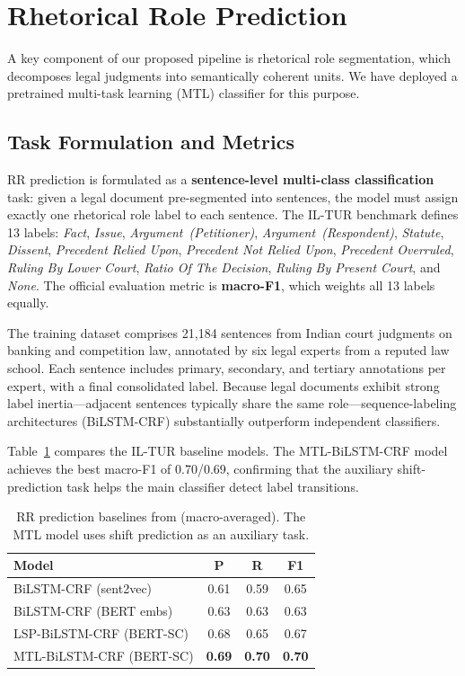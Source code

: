\documentclass[11pt]{article}
\begin{document}
\section{Rhetorical Role Prediction}

A key component of our proposed pipeline is rhetorical role segmentation, which decomposes legal judgments into semantically coherent units.
We have deployed a pretrained multi-task learning (MTL) classifier for this purpose.

\subsection{Task Formulation and Metrics}

RR prediction is formulated as a \textbf{sentence-level multi-class classification} task: given a legal document pre-segmented into sentences, the model must assign exactly one rhetorical role label to each sentence.
The IL-TUR benchmark defines 13 labels: \emph{Fact}, \emph{Issue}, \emph{Argument~(Petitioner)}, \emph{Argument~(Respondent)}, \emph{Statute}, \emph{Dissent}, \emph{Precedent Relied Upon}, \emph{Precedent Not Relied Upon}, \emph{Precedent Overruled}, \emph{Ruling By Lower Court}, \emph{Ratio Of The Decision}, \emph{Ruling By Present Court}, and \emph{None}.
The official evaluation metric is \textbf{macro-F1}, which weights all 13 labels equally.

The training dataset \cite{malik2022rr} comprises 21,184 sentences from Indian court judgments on banking and competition law, annotated by six legal experts from a reputed law school.
Each sentence includes primary, secondary, and tertiary annotations per expert, with a final consolidated label.
Because legal documents exhibit strong label inertia---adjacent sentences typically share the same role---sequence-labeling architectures (BiLSTM-CRF) substantially outperform independent classifiers.

Table~\ref{tab:rr_baselines} compares the IL-TUR baseline models.
The MTL-BiLSTM-CRF model achieves the best macro-F1 of 0.70/0.69, confirming that the auxiliary shift-prediction task helps the main classifier detect label transitions.

\begin{table}[htbp]
\centering
\small
\begin{tabular}{@{}lccc@{}}
\toprule
\textbf{Model} & \textbf{P} & \textbf{R} & \textbf{F1} \\
\midrule
BiLSTM-CRF (sent2vec)        & 0.61 & 0.59 & 0.65 \\
BiLSTM-CRF (BERT embs)       & 0.63 & 0.63 & 0.63 \\
LSP-BiLSTM-CRF (BERT-SC)     & 0.68 & 0.65 & 0.67 \\
MTL-BiLSTM-CRF (BERT-SC)     & \textbf{0.69} & \textbf{0.70} & \textbf{0.70} \\
\bottomrule
\end{tabular}
\caption{RR prediction baselines from \citet{malik2022rr} (macro-averaged). The MTL model uses shift prediction as an auxiliary task.}
\label{tab:rr_baselines}
\end{table}
\end{document}
